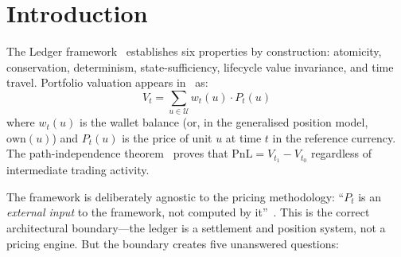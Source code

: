 \documentclass[11pt,a4paper]{article}
\begin{document}
\begin{abstract}
Fourth, it tightens \emph{integration with the Ledger}: the price function $P(u, \mathrm{state}_t(u), \mathrm{market\_data}_t)$ is a formal definition, the lifecycle-valuation ordering protocol is embedded in the FSM, and the Taylor approximation is explicitly positioned as the price in state \textsc{Explained} between repricing cycles.

Fifth, it hardens the \emph{production architecture} with a scalability analysis: one workflow per unit at 100{,}000 units with 30-second average cadence yields 200{,}000 workflow executions per minute, within Temporal cluster capacity with horizontal scaling.

The document retains all material from v0.2 (the ValuationRecord, Pricing DAG, Temporal workflow architecture, PnL explain gate, continuous approximate pricing, valuation store, edge cases, worked examples, and lifecycle consistency) and integrates the new contributions into the existing structure.
\end{abstract}

\tableofcontents
\clearpage

\section{Introduction}
\label{sec:intro}

The Ledger framework~\cite{ledger} establishes six properties by construction: atomicity, conservation, determinism, state-sufficiency, lifecycle value invariance, and time travel.  Portfolio valuation appears in~\cite[\S4]{ledger} as:
\[
V_t = \sum_{u \in \mathcal{U}} w_t(u) \cdot P_t(u)
\]
where $w_t(u)$ is the wallet balance (or, in the generalised position model, $\mathrm{own}(u)$) and $P_t(u)$ is the price of unit $u$ at time $t$ in the reference currency.  The path-independence theorem~\cite[\S4.3]{ledger} proves that $\mathrm{PnL} = V_{t_1} - V_{t_0}$ regardless of intermediate trading activity.

The framework is deliberately agnostic to the pricing methodology: ``$P_t$ is an \emph{external input} to the framework, not computed by it''~\cite[\S4.1]{ledger}.  This is the correct architectural boundary---the ledger is a settlement and position system, not a pricing engine.  But the boundary creates five unanswered questions:
\end{document}
